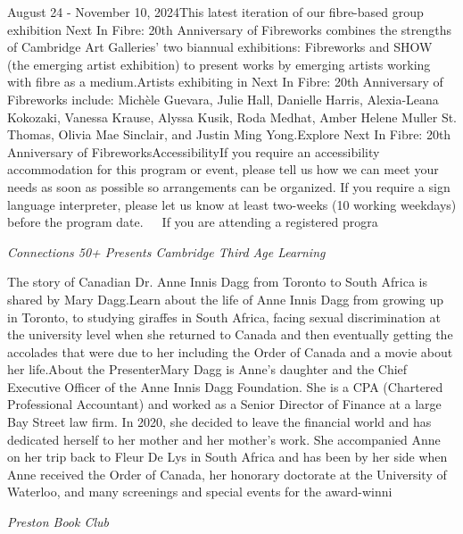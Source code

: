 \documentclass[letterpaper, 10pt]{article}
\newcommand{\subtitle}[1]{\textit{\large #1}\vspace{0.5em}}
\newcommand{\articlecontent}[1]{\small #1\vspace{1em}}
\begin{document}
\begin{multicols}{2}
{August 24 - November 10, 2024This latest iteration of our fibre-based group exhibition Next In Fibre: 20th Anniversary of Fibreworks combines the strengths of Cambridge Art Galleries’ two biannual exhibitions: Fibreworks and SHOW (the emerging artist exhibition) to present works by emerging artists working with fibre as a medium.Artists exhibiting in Next In Fibre: 20th Anniversary of Fibreworks include: Michèle Guevara, Julie Hall, Danielle Harris, Alexia-Leana Kokozaki, Vanessa Krause, Alyssa Kusik, Roda Medhat, Amber Helene Muller St. Thomas, Olivia Mae Sinclair, and Justin Ming Yong.Explore Next In Fibre: 20th Anniversary of FibreworksAccessibilityIf you require an accessibility accommodation for this program or event, please tell us how we can meet your needs as soon as possible so arrangements can be organized. If you require a sign language interpreter, please let us know at least two-weeks (10 working weekdays) before the program date.   If you are attending a registered progra
}
\vspace{10px}

\subtitle{Connections 50+ Presents Cambridge Third Age Learning}

\articlecontent{

\qrcode[height=1.5cm]{https://ideaexchange.libnet.info/event/11426267}
\vspace{10px}

The story of Canadian Dr. Anne Innis Dagg from Toronto to South Africa is shared by Mary Dagg.Learn about the life of Anne Innis Dagg from growing up in Toronto, to studying giraffes in South Africa, facing sexual discrimination at the university level when she returned to Canada and then eventually getting the accolades that were due to her including the Order of Canada and a movie about her life.About the PresenterMary Dagg is Anne’s daughter and the Chief Executive Officer of the Anne Innis Dagg Foundation. She is a CPA (Chartered Professional Accountant) and worked as a Senior Director of Finance at a large Bay Street law firm. In 2020, she decided to leave the financial world and has dedicated herself to her mother and her mother’s work. She accompanied Anne on her trip back to Fleur De Lys in South Africa and has been by her side when Anne received the Order of Canada, her honorary doctorate at the University of Waterloo, and many screenings and special events for the award-winni
}
\vspace{10px}

\subtitle{Preston Book Club}

\articlecontent{

}
\end{multicols}
\end{document}
